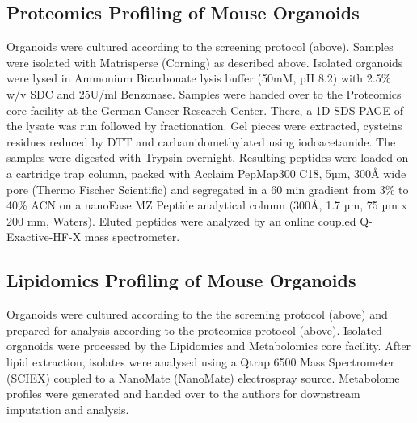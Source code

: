 \begin{flushleft}
\subsection{Proteomics Profiling of Mouse Organoids}
Organoids were cultured according to the screening protocol (above). Samples were isolated with Matrisperse (Corning) as described above. Isolated organoids were lysed in Ammonium Bicarbonate lysis buffer (50mM, pH 8.2) with 2.5\% w/v SDC and 25U/ml Benzonase. 
Samples were handed over to the Proteomics core facility at the German Cancer Research Center. There, a 1D-SDS-PAGE of the lysate was run followed by fractionation. Gel pieces were extracted, cysteins residues reduced by DTT and carbamidomethylated using iodoacetamide. The samples were digested with Trypsin overnight.
Resulting peptides were loaded on a cartridge trap column, packed with Acclaim PepMap300 C18, 5µm, 300Å wide pore (Thermo Fischer Scientific) and segregated in a 60 min gradient from 3\% to 40\% ACN on a nanoEase MZ Peptide analytical column (300Å, 1.7 µm, 75 µm x 200 mm, Waters). Eluted peptides were analyzed by an online coupled Q-Exactive-HF-X mass spectrometer.

\subsection{Lipidomics Profiling of Mouse Organoids}
Organoids were cultured according to the the screening protocol (above) and prepared for analysis according to the proteomics protocol (above). 
Isolated organoids were processed by the Lipidomics and Metabolomics core facility. 
After lipid extraction, isolates were analysed using a Qtrap 6500 Mass Spectrometer (SCIEX) coupled to a NanoMate (NanoMate) electrospray source. Metabolome profiles were generated and handed over to the authors for downstream imputation and analysis.


\end{flushleft}

